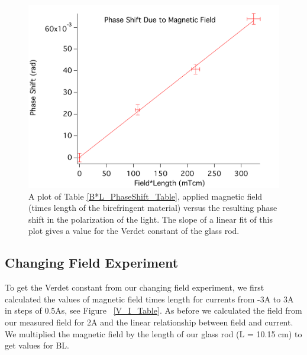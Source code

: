 \documentclass[prb,preprint]{revtex4-1}
\begin{document}
\begin{figure}[h!]
\centering
\includegraphics[width=5in]{PhaseShift_B-L_Plot.pdf}
\caption{A plot of Table \ref{B*L_PhaseShift_Table}, applied magnetic field (times length of the birefringent material) versus the resulting phase shift in the polarization of the light. The slope of a linear fit of this plot gives a value for the Verdet constant of the glass rod. }
\label{PhaseShift_B*L_Plot}
\end{figure}


\subsection{Changing Field Experiment}

To get the Verdet constant from our changing field experiment, we first calculated the values of magnetic field times length for currents from -3A to 3A in steps of 0.5As, see Figure ~\ref{V_I_Table}. As before we calculated the field from our measured field for 2A and the linear relationship between field and current. We multiplied the magnetic field by the length of our glass rod (L = 10.15 cm) to get values for BL. 
\end{document}
